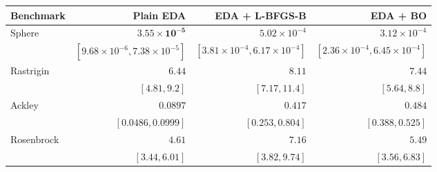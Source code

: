 \begin{tabular}{lrrr}
\toprule
Benchmark & Plain EDA & EDA + L-BFGS-B & EDA + BO \\
\midrule
Sphere & $\mathbf{3.55\!\times\!10^{-5}}$ & $5.02\!\times\!10^{-4}$ & $3.12\!\times\!10^{-4}$ \\
 & $[9.68\!\times\!10^{-6},7.38\!\times\!10^{-5}]$ & $[3.81\!\times\!10^{-4},6.17\!\times\!10^{-4}]$ & $[2.36\!\times\!10^{-4},6.45\!\times\!10^{-4}]$ \\[3pt]
Rastrigin & $\mathbf{6.44}$ & $8.11$ & $7.44$ \\
 & $[4.81,9.2]$ & $[7.17,11.4]$ & $[5.64,8.8]$ \\[3pt]
Ackley & $\mathbf{0.0897}$ & $0.417$ & $0.484$ \\
 & $[0.0486,0.0999]$ & $[0.253,0.804]$ & $[0.388,0.525]$ \\[3pt]
Rosenbrock & $\mathbf{4.61}$ & $7.16$ & $5.49$ \\
 & $[3.44,6.01]$ & $[3.82,9.74]$ & $[3.56,6.83]$ \\[3pt]
\bottomrule
\end{tabular}
